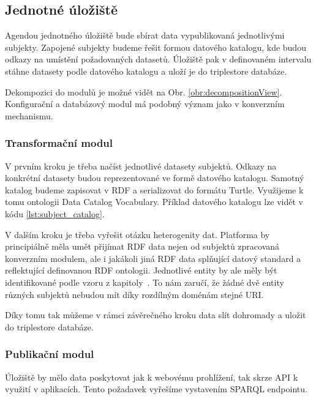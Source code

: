 \subsection{Jednotné úložiště}

Agendou jednotného úložiště bude sbírat data vypublikovaná jednotlivými subjekty. Zapojené subjekty budeme řešit formou datového katalogu, kde budou odkazy na umístění požadovaných datasetů. Úložiště pak v definovaném intervalu stáhne datasety podle datového katalogu a uloží je do triplestore databáze.

Dekompozici do modulů je možné vidět na Obr. \ref{obr:decompositionView}. Konfigurační a databázový modul má podobný význam jako v konverzním mechanismu.

\subsubsection*{Transformační modul}

V prvním kroku je třeba načíst jednotlivé datasety subjektů. Odkazy na konkrétní datasety budou reprezentované ve formě datového katalogu. Samotný katalog budeme zapisovat v RDF a serializovat do formátu Turtle. Využijeme k tomu ontologii Data Catalog Vocabulary. Příklad datového katalogu lze vidět v kódu \ref{lst:subject_catalog}.

V dalším kroku je třeba vyřešit otázku heterogenity dat. Platforma by principiálně měla umět přijímat RDF data nejen od subjektů zpracovaná konverzním modulem, ale i jakákoli jiná RDF data splňující datový standard a reflektující definovanou RDF ontologii. Jednotlivé entity by ale měly být identifikované podle vzoru z kapitoly~. To nám zaručí, že žádné dvě entity různých subjektů nebudou mít díky rozdílným doménám stejné URI. 

Díky tomu tak můžeme v rámci závěrečného kroku data slít dohromady a uložit do triplestore databáze.



\subsubsection*{Publikační modul}

Úložiště by mělo data poskytovat jak k webovému prohlížení, tak skrze API k využití v aplikacích. Tento požadavek vyřešíme vystavením SPARQL endpointu.

